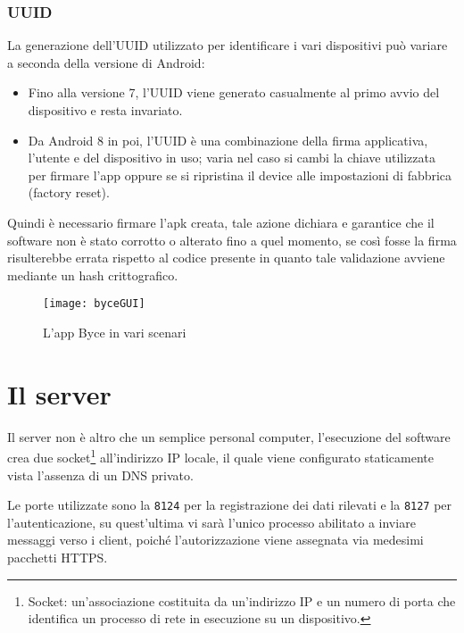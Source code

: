\documentclass[target=bach]{thud}
\begin{document}
        \subsubsection{UUID}
            La generazione dell'UUID utilizzato per identificare i vari dispositivi può variare a seconda della versione di Android:
            \begin{itemize}
                \setlength{\itemsep}{1pt}
                \item Fino alla versione 7, l'UUID viene generato casualmente al primo avvio del dispositivo e resta invariato.
                \item Da Android 8 in poi, l'UUID è una combinazione della firma applicativa, l'utente e del dispositivo in uso; varia nel caso si cambi la chiave utilizzata per firmare l'app oppure se si ripristina il device alle impostazioni di fabbrica (factory reset).
            \end{itemize}
            Quindi è necessario firmare l'apk creata, tale azione dichiara e garantice che il software non è stato corrotto o alterato fino a quel momento, se così fosse la firma risulterebbe errata rispetto al codice presente in quanto tale validazione avviene mediante un hash crittografico.\\


        \graphicspath{ {./img/} }
        \begin{figure}[h]
            \centering
            \texttt{[image: byceGUI]}
            \caption{L'app Byce in vari scenari}
            \label{fig:usecase}
        \end{figure}

\newpage

    \section{Il server}

        Il server non è altro che un semplice personal computer, l'esecuzione del software crea due socket\footnote[12]{Socket: un'associazione costituita da un'indirizzo IP e un numero di porta che identifica un processo di rete in esecuzione su un dispositivo.} all'indirizzo IP locale, il quale viene configurato staticamente vista l'assenza di un DNS privato.

        Le porte utilizzate sono la \texttt{8124} per la registrazione dei dati rilevati e la \texttt{8127} per l'autenticazione, su quest'ultima vi sarà l'unico processo abilitato a inviare messaggi verso i client, poiché l'autorizzazione viene assegnata via medesimi pacchetti HTTPS.
\end{document}
